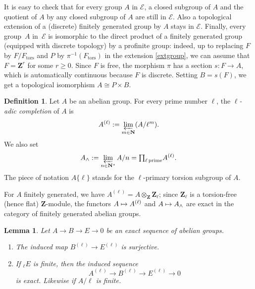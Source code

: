 \documentclass[10pt,a4paper]{amsart}
\let\mathcal\mathscr
\newenvironment{enumeratea}
{\bgroup\def\theenumi{\alph{enumi}}\begin{enumerate}}
{\end{enumerate}\egroup}
\newcommand\mto{\mathchoice{\longmapsto}{\mapsto}{\mapsto}{\mapsto}}
\newcommand{\tprod}{{\textstyle\prod}}
\theoremstyle{plain}
\newtheorem{lem}[theo]{Lemma}
\theoremstyle{definition}
\newtheorem{defi}[theo]{Definition}
\newcommand \ZZ {\mathbf{Z}}
\newcommand \NN {\mathbf{N}}
\newcommand \tors {\mathrm{tors}}
\begin{document}
It is easy to check that
for every group $A$ in $\mathcal E$, a closed subgroup of $A$ and
the quotient of $A$ by any closed subgroup of $A$ are still in $\mathcal E$.
Also a topological extension of a (discrete) finitely generated group by $A$
stays in $\mathcal E$. Finally, every group~$A$ in~$\mathcal E$ is isomorphic
to the direct product of a finitely generated
group (equipped with discrete topology) by a profinite group: indeed, up to replacing $F$ by
$F/F_\tors$ and $P$ by $\pi^{-1}(F_\tors)$
in the extension \eqref{extgroup}, we can assume
that $F=\ZZ^r$ for some $r \geq 0$. Since $F$ is free, the morphism
$\pi$ has a section $s: F \to A$, which is automatically continuous
because $F$ is discrete. Setting $B=s(F)$, we get a topological isomorphism
$A \cong P \times B$.

\begin{defi}
Let $A$ be an abelian group. For every prime number $\ell$,
the \emph{$\ell$-adic completion} of $A$ is
\[
A^{(\ell)}:=\varprojlim_{m \in \NN} (A/\ell^m).
\] We also
set
\[
A_{\wedge}:=\varprojlim_{n \in \NN^*}
A/n=\tprod_{\ell \, \mathrm{prime}} A^{(\ell)}.
\]
The piece of notation $A \{\ell\}$ stands for the $\ell$-primary
torsion subgroup of $A$.
\end{defi}

For $A$ finitely generated, we have
$A^{(\ell)}=A \otimes_{\ZZ} \ZZ_{\ell}$; since $\ZZ_{\ell}$ is a torsion-free
(hence flat) $\ZZ$-module, the functors $A \mto A^{(\ell)}$ and
$A \mto A_{\wedge}$ are exact in the category of finitely generated
abelian groups.

\pagebreak[2]
\begin{lem} \label{exactcomp}
Let $A \to B \to E \to 0$ be an exact sequence of abelian groups.
\begin{enumeratea}
\item\label{exactcompa}
The induced map $B^{(\ell)} \to E^{(\ell)}$ is surjective.

\item\label{exactcompb}
If $_{\ell} E$ is finite, then the induced sequence
\[
A^{(\ell)} \to B^{(\ell)} \to E^{(\ell)} \to 0
\]
is exact. Likewise if $A/\ell$ is finite.
\end{enumeratea}
\end{lem}
\end{document}
